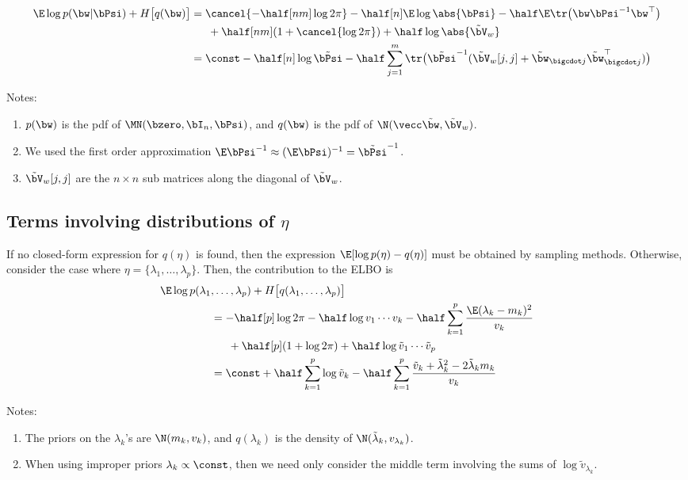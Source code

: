 \begin{align*}
  \E \log p(\bw|\bPsi) + H \big[q(\bw) \big] 
  &= \cancel{-\half[nm]\log 2\pi} - \half[n]\E\log\abs{\bPsi} - \half\E\tr \big( \bw \bPsi^{-1} \bw^\top \big) \\
  &\phantom{==} + \half[nm](1 + \cancel{\log 2\pi}) + \half\log\abs{\tilde\bV_w} \\
  &= \const - \half[n]\log\tilde\bPsi 
  - \half \sum_{j=1}^m \tr \big(\tilde\bPsi^{-1} (\tilde\bV_w[j,j]  + \tilde\bw_{\bigcdot j}\tilde\bw_{\bigcdot j}^\top)\big)
\end{align*}

Notes:
\begin{enumerate}
  \item $p(\bw)$ is the pdf of $\MN(\bzero,\bI_n,\bPsi)$, and $q(\bw)$ is the pdf of $\N(\vecc \tilde\bw,\tilde\bV_w)$.
  \item We used the first order approximation $\E \bPsi^{-1} \approx (\E \bPsi)^{-1} = \tilde\bPsi^{-1}$.
  \item $\tilde\bV_w[j,j]$ are the $n \times n$ sub matrices along the diagonal of $\tilde\bV_w$.
\end{enumerate}

\subsection{Terms involving distributions of $\eta$}

If no closed-form expression for $q(\eta)$ is found, then the expression $\E [\log p(\eta) - q(\eta)]$ must be obtained by sampling methods.
Otherwise, consider the case where $\eta =\{\lambda_1,\dots,\lambda_p\}$.
Then, the contribution to the ELBO is
\begin{align*}
  \E \log p(\lambda_1 & ,\dots,\lambda_p) + H\big[q(\lambda_1,\dots,\lambda_p) \big] \\
  &=  -\half[p]\log 2\pi - \half\log v_1\cdots v_k - \half \sum_{k=1}^p  \frac{\E(\lambda_k - m_k)^2}{v_k} \\
  &\phantom{==} + \half[p](1 + \log 2\pi) + \half\log \tilde v_1\cdots \tilde v_p \\
  &= \const + \half \sum_{k=1}^p \log \tilde v_k - \half \sum_{k=1}^p  \frac{\tilde v_k + \tilde\lambda_k^2 - 2\tilde\lambda_k m_k}{v_k}
\end{align*}

Notes:
\begin{enumerate}
  \item The priors on the $\lambda_k$'s are $\N(m_k,v_k)$, and  $q(\lambda_k)$ is the density of $\N(\tilde\lambda_k, v_{\lambda_k})$.
  \item When using improper priors $\lambda_k \propto \const$, then we need only consider the middle term involving the sums of $\log \tilde v_{\lambda_k}$.
\end{enumerate}

